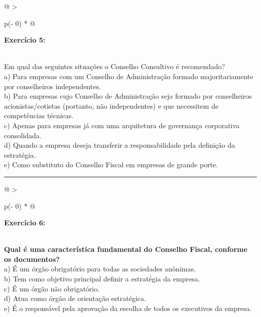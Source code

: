 \documentclass[
]{book}
\begin{document}
\begin{longtable}[]{@{}
  >{\raggedright\arraybackslash}p{(\columnwidth - 0\tabcolsep) * }@{}}
\toprule\noalign{}
\begin{minipage}[b]{\linewidth}\raggedright
\textbf{Exercício 5:}
\end{minipage} \\
\midrule\noalign{}
\endhead
\bottomrule\noalign{}
\endlastfoot
Em qual das seguintes situações o Conselho Consultivo é recomendado? \\
a) Para empresas com um Conselho de Administração formado majoritariamente por conselheiros independentes. \\
b) Para empresas cujo Conselho de Administração seja formado por conselheiros acionistas/cotistas (portanto, não independentes) e que necessitem de competências técnicas. \\
c) Apenas para empresas já com uma arquitetura de governança corporativa consolidada. \\
d) Quando a empresa deseja transferir a responsabilidade pela definição da estratégia. \\
e) Como substituto do Conselho Fiscal em empresas de grande porte. \\
\end{longtable}

\begin{center}\rule{0.5\linewidth}{0.5pt}\end{center}

\begin{longtable}[]{@{}
  >{\raggedright\arraybackslash}p{(\columnwidth - 0\tabcolsep) * }@{}}
\toprule\noalign{}
\begin{minipage}[b]{\linewidth}\raggedright
\textbf{Exercício 6:}
\end{minipage} \\
\midrule\noalign{}
\endhead
\bottomrule\noalign{}
\endlastfoot
\textbf{Qual é uma característica fundamental do Conselho Fiscal, conforme os documentos?} \\
a) É um órgão obrigatório para todas as sociedades anônimas. \\
b) Tem como objetivo principal definir a estratégia da empresa. \\
c) É um órgão não obrigatório. \\
d) Atua como órgão de orientação estratégica. \\
e) É o responsável pela aprovação da escolha de todos os executivos da empresa. \\
\end{longtable}
\end{document}
